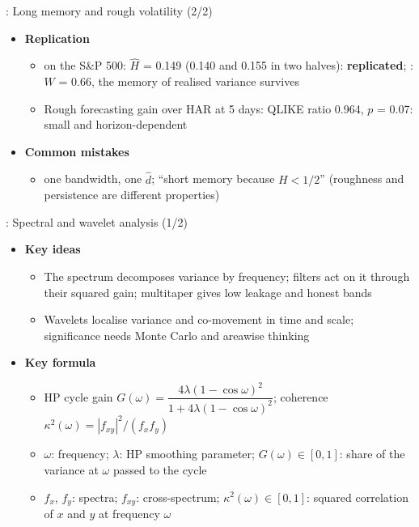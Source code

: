 \begin{frame}{: Long memory and rough volatility (2/2)}
\itemsize{\small}
\begin{itemize}
    \item \textbf{Replication}
    \begin{itemize}
        \item {} on the S\&P 500: $\hat H$ = 0.149 (0.140 and 0.155 in two halves): \textbf{replicated}; : $W$ = 0.66, the memory of realised variance survives
        \item Rough forecasting gain over HAR at 5 days: QLIKE ratio 0.964, $p$ = 0.07: small and horizon-dependent
    \end{itemize}
    \item \textbf{Common mistakes}
    \begin{itemize}
        \item one bandwidth, one $\hat d$; ``short memory because $H < 1/2$'' (roughness and persistence are different properties)
    \end{itemize}
\end{itemize}
\end{frame}

\begin{frame}{: Spectral and wavelet analysis (1/2)}
\itemsize{\footnotesize}
\begin{itemize}
    \item \textbf{Key ideas}
    \begin{itemize}
        \item The spectrum decomposes variance by frequency; filters act on it through their squared gain; multitaper gives low leakage and honest bands
        \item Wavelets localise variance and co-movement in time and scale; significance needs Monte Carlo and areawise thinking
    \end{itemize}
    \item \textbf{Key formula}
    \begin{itemize}
        \item HP cycle gain $G(\omega) = \dfrac{4\lambda(1 - \cos\omega)^2}{1 + 4\lambda(1 - \cos\omega)^2}$; coherence $\kappa^2(\omega) = |f_{xy}|^2/(f_xf_y)$
        \item $\omega$: frequency; $\lambda$: HP smoothing parameter; $G(\omega) \in [0, 1]$: share of the variance at $\omega$ passed to the cycle
        \item $f_x$, $f_y$: spectra; $f_{xy}$: cross-spectrum; $\kappa^2(\omega) \in [0, 1]$: squared correlation of $x$ and $y$ at frequency $\omega$
    \end{itemize}
\end{itemize}
\end{frame}

